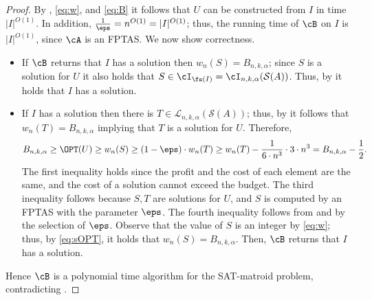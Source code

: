 \begin{proof}
By , \eqref{eq:w}, and \eqref{eq:B} it follows that $U$ can be constructed from $I$ in time $|I|^{O(1)}$.   In addition, %
$\frac{1}{\eps} = n^{O(1)} =|I|^{O(1)}$; thus, the running time of $\cB$ on $I$ is $|I|^{O(1)}$, since $\cA$ is an FPTAS. We now show correctness. %
	\begin{itemize}
		\item If $\cB$ returns that $I$ has a solution then $w_n(S) = B_{n,k,\alpha}$; since $S$ is a solution for $U$ it also holds that $S \in \cI_{\fs (I)} = \cI_{n,k,\alpha}(\mathcal{S}(A))$. Thus, by  it holds that $I$ has a solution.  
		\item If $I$ has a solution then there is $T \in \mathcal{L}_{n,k,\alpha}(\mathcal{S}(A))$; thus, by   it follows that $w_n(T) = B_{n,k,\alpha}$ implying that $T$ is a solution for $U$.  Therefore, %
		\begin{equation}
			\label{eq:sOPT}
			B_{n,k,\alpha} \geq \OPT(U) \geq w_n(S) \geq (1-\eps) \cdot w_n(T) \geq  w_n(T)-\frac{1}{6 \cdot n^3} \cdot 3 \cdot n^3 = B_{n,k,\alpha}-\frac{1}{2}.
		\end{equation} 	The first inequality holds since %
		the profit and the cost of each element are the same, and the cost of a solution cannot exceed the budget. The third inequality follows because $S,T$ are solutions for $U$, and $S$ is computed by an FPTAS with the parameter $\eps$. The fourth inequality follows from  and by the selection of $\eps$. Observe that the value of $S$ is an integer by \eqref{eq:w}; thus, by \eqref{eq:sOPT}, %
		it holds that $w_n(S) = B_{n,k,\alpha}$. Then, $\cB$ returns that $I$ has a solution.  
	\end{itemize}
Hence $\cB$ is %
	a polynomial time algorithm for the  SAT-matroid problem, contradicting . 
\end{proof}



